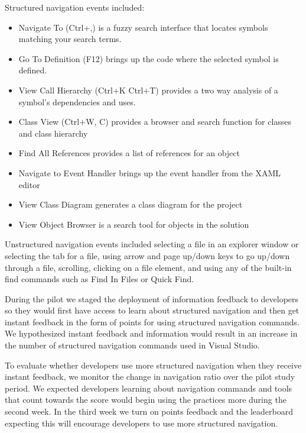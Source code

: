 \documentclass{sig-alternate}
\begin{document}
Structured navigation events included: 
\begin{itemize}[itemsep=0mm]
\item Navigate To (Ctrl+,) is a fuzzy search interface that locates symbols matching your search terms.
\item Go To Definition (F12) brings up the code where the selected symbol is defined. 
\item View Call Hierarchy (Ctrl+K Ctrl+T) provides a two way analysis of a symbol's dependencies and uses. 
\item Class View (Ctrl+W, C) provides a browser and search function for classes and class hierarchy
\item Find All References provides a list of references for an object
\item Navigate to Event Handler brings up the event handler from the XAML editor
\item View Class Diagram generates a class diagram for the project
\item View Object Browser is a search tool for objects in the solution
\end{itemize}

Unstructured navigation events included selecting a file in an explorer window or selecting the tab for a file, using arrow and page up/down keys to go up/down through a file, scrolling, clicking on a file element, and using any of the built-in find commands such as Find In Files or Quick Find.

During the pilot we staged the deployment of information feedback to developers so they would first have access to learn about structured navigation and then get instant feedback in the form of points for using structured navigation commands.  We hypothesized instant feedback and information would result in an increase in the number of structured navigation commands used in Visual Studio.

To evaluate whether developers use more structured navigation when they receive instant feedback, we monitor the change in navigation ratio over the pilot study period.   We expected developers learning about navigation commands and tools that count towards the score would begin using the practices more during the second week.  In the third week we turn on points feedback and the leaderboard expecting this will encourage developers to use more structured navigation.  
\end{document}
